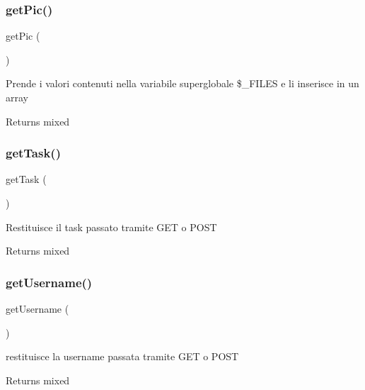 \subsubsection{\texorpdfstring{get\+Pic()}{getPic()}}
{\footnotesize\ttfamily get\+Pic (\begin{DoxyParamCaption}{ }\end{DoxyParamCaption})}

Prende i valori contenuti nella variabile superglobale \$\+\_\+\+F\+I\+L\+ES e li inserisce in un array

\begin{DoxyReturn}{Returns}
mixed 
\end{DoxyReturn}
\mbox{\label{class_v_upload_a13871c4434338f02d6f8d430fa0597f2}} 
\subsubsection{\texorpdfstring{get\+Task()}{getTask()}}
{\footnotesize\ttfamily get\+Task (\begin{DoxyParamCaption}{ }\end{DoxyParamCaption})}

Restituisce il task passato tramite G\+ET o P\+O\+ST

\begin{DoxyReturn}{Returns}
mixed 
\end{DoxyReturn}
\mbox{\label{class_v_upload_a81b37a3c9d639574e394f80c1138c75e}} 
\subsubsection{\texorpdfstring{get\+Username()}{getUsername()}}
{\footnotesize\ttfamily get\+Username (\begin{DoxyParamCaption}{ }\end{DoxyParamCaption})}

restituisce la username passata tramite G\+ET o P\+O\+ST

\begin{DoxyReturn}{Returns}
mixed 
\end{DoxyReturn}
\mbox{\label{class_v_upload_a64bdc484fc7074989b4b2c0ebc63aec2}} 
